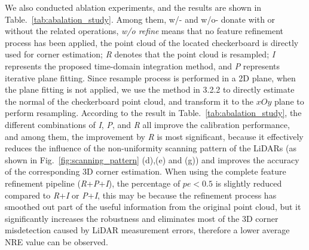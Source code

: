 \documentclass[journal]{vgtc}
\begin{document}
We also conducted ablation experiments, and the results are shown in Table.~\ref{tab:abalation_study}. Among them, w/- and w/o- donate with or without the related operations, \textit{w/o refine} means that no feature refinement process has been applied, the point cloud of the located checkerboard is directly used for corner estimation; \textit{R} denotes that the point cloud is resampled; \textit{I} represents the proposed time-domain integration method, and \textit{P} represents iterative plane fitting. Since resample process is performed in a 2D plane, when the plane fitting is not applied, we use the method in 3.2.2 to directly estimate the normal of the checkerboard point cloud, and transform it to the $xOy$ plane to perform resampling. According to the result in Table.~\ref{tab:abalation_study}, the different combinations of \textit{I}, \textit{P}, and \textit{R} all improve the calibration performance, and among them, the improvement by \textit{R} is most significant, because it effectively reduces the influence of the non-uniformity scanning pattern of the LiDARs (as shown in Fig.~\ref{fig:scanning_pattern} (d),(e) and (g)) and improves the accuracy of the corresponding 3D corner estimation. When using the complete feature refinement pipeline (\textit{R}+\textit{P}+\textit{I}), the percentage of $pe<0.5$ is slightly reduced compared to \textit{R}+\textit{I} or \textit{P}+\textit{I}, this may be because the refinement process has smoothed out part of the useful information from the original point cloud, but it significantly increases the robustness and eliminates most of the 3D corner misdetection caused by LiDAR measurement errors, therefore a lower average NRE value can be observed.




\end{document}
